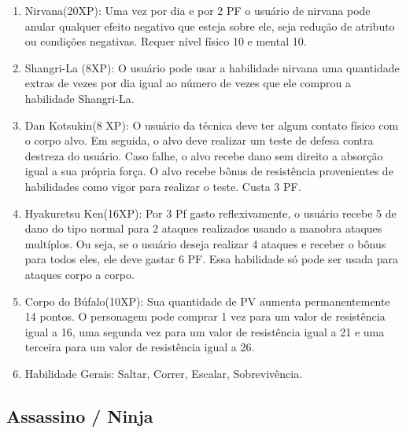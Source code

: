 \begin{enumerate}
	\item Nirvana(20XP): Uma vez por dia e por 2 PF o usuário de nirvana pode anular qualquer efeito negativo que esteja sobre ele, seja redução de atributo ou condições negativas. Requer nível físico 10 e mental 10.
	  
  \item Shangri-La (8XP): O usuário pode usar a habilidade nirvana uma quantidade extras de vezes por dia igual ao número de vezes que ele comprou a habilidade Shangri-La.
	
	\item Dan Kotsukin(8 XP): O usuário da técnica deve ter algum contato físico com o corpo alvo. Em seguida, o alvo deve realizar um teste de defesa contra destreza do usuário. Caso falhe, o alvo recebe dano sem direito a absorção igual a sua própria força. O alvo recebe bônus de resistência provenientes de habilidades como vigor para realizar o teste. Custa 3 PF. 
	
	\item Hyakuretsu Ken(16XP): Por 3 Pf gasto reflexivamente, o usuário recebe 5 de dano do tipo normal para 2 ataques realizados usando a manobra ataques multíplos. Ou seja, se o usuário deseja realizar 4 ataques e receber o bônus para todos eles, ele deve gastar 6 PF. Essa habilidade só pode ser usada para ataques corpo a corpo.
 	
    \item Corpo do Búfalo(10XP): Sua quantidade de PV aumenta permanentemente 14 pontos. O personagem pode comprar 1 vez para um valor de resistência igual a 16, uma segunda vez para um valor de resistência igual a 21 e uma terceira para um valor de resistência igual a 26.

  
  	\item Habilidade Gerais: Saltar, Correr, Escalar, Sobrevivência.
\end{enumerate}

\subsection{Assassino / Ninja} 

